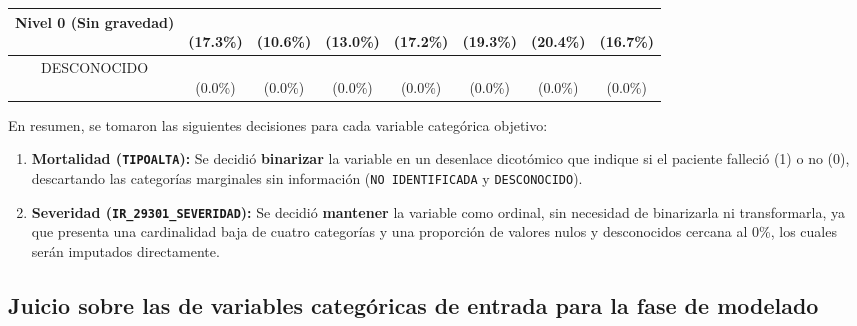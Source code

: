 \begin{table}[htbp]
\begin{tabular}{|c|c|c|c|c|c|c|c|}
\parbox[t]{4.0cm}{\raggedright Nivel 0 (Sin gravedad)} & \parbox[t]{1.2cm}{\\(17.3\%)} & \parbox[t]{1.2cm}{\\(10.6\%)} & \parbox[t]{1.2cm}{\\(13.0\%)} & \parbox[t]{1.2cm}{\\(17.2\%)} & \parbox[t]{1.2cm}{\\(19.3\%)} & \parbox[t]{1.2cm}{\\(20.4\%)} & \parbox[t]{1.6cm}{\\(16.7\%)} \\ \hline
\parbox[t]{4.0cm}{\raggedright DESCONOCIDO} & \parbox[t]{1.2cm}{\\(0.0\%)} & \parbox[t]{1.2cm}{\\(0.0\%)} & \parbox[t]{1.2cm}{\\(0.0\%)} & \parbox[t]{1.2cm}{\\(0.0\%)} & \parbox[t]{1.2cm}{\\(0.0\%)} & \parbox[t]{1.2cm}{\\(0.0\%)} & \parbox[t]{1.6cm}{\\(0.0\%)} \\ \hline
\end{tabular}
\end{table}

En resumen, se tomaron las siguientes decisiones para cada variable categórica objetivo:
\begin{enumerate}
    \item \textbf{Mortalidad (\texttt{TIPOALTA}):} Se decidió \textbf{binarizar} la variable en un desenlace dicotómico que indique si el paciente falleció (1) o no (0), descartando las categorías marginales sin información (\texttt{NO IDENTIFICADA} y \texttt{DESCONOCIDO}).
    \item \textbf{Severidad (\texttt{IR\_29301\_SEVERIDAD}):} Se decidió \textbf{mantener} la variable como ordinal, sin necesidad de binarizarla ni transformarla, ya que presenta una cardinalidad baja de cuatro categorías y una proporción de valores nulos y desconocidos cercana al 0\%, los cuales serán imputados directamente.
\end{enumerate}

\subsection{Juicio sobre las de variables categóricas de entrada para la fase de modelado}

